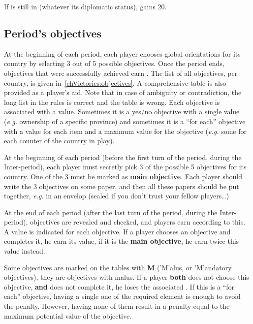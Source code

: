 \aparag[Special]
\bparag If \paysChevaliers is still in \provinceRhodos (whatever its
diplomatic status), \HIS gains 20\VPs.

\subsection{Period's objectives}
\aparag[Overview]
\bparag At the beginning of each period, each player chooses global
orientations for its country by selecting 3 out of 5 possible objectives.
\bparag Once the period ends, objectives that were successfully achieved earn
\VPs.
\bparag The list of all objectives, per country, is given
in~\ref{chVictories:objectives}. A comprehensive table is also provided as a
player's aid. Note that in case of ambiguity or contradiction, the long list
in the rules is correct and the table is wrong.
\bparag Each objective is associated with a \VPs value. Sometimes it is a
yes/no objective with a single value (\emph{e.g.} ownership of a specific
province) and sometimes it is a ``for each'' objective with a value for each
item and a maximum value for the objective (\emph{e.g.} some \VPs for each
\TradeFLEET counter of the country in play).

\bparag At the beginning of each period (before the first turn of the period,
during the Inter-period), each player must secretly pick 3 of the possible 5
objectives for its country.
\bparag One of the 3 must be marked as \textbf{main objective}.
\bparag Each player should write the 3 objectives on some paper, and then all
these papers should be put together, \emph{e.g.} in an envelop (sealed if you
don't trust your fellow players\ldots)

\bparag At the end of each period (after the last turn of the period, during
the Inter-period), objectives are revealed and checked, and players earn \VPs
according to this.
\bparag A \VP value is indicated for each objective. If a player chooses
an objective and completes it, he earn its \VP value, if it is the
\textbf{main objective}, he earn twice this value instead.

\bparag Some objectives are marked on the tables with {\bf M} ('M'alus, or
'M'andatory objectives), they are objectives with malus.
\bparag If a player \textbf{both} does not choose this objective, \textbf{and}
does not complete it, he loses the associated \VPs.
\bparag If this is a ``for each'' objective, having a single one of the
required element is enough to avoid the penalty. However, having none of them
result in a penalty equal to the maximum potential value of the objective.


